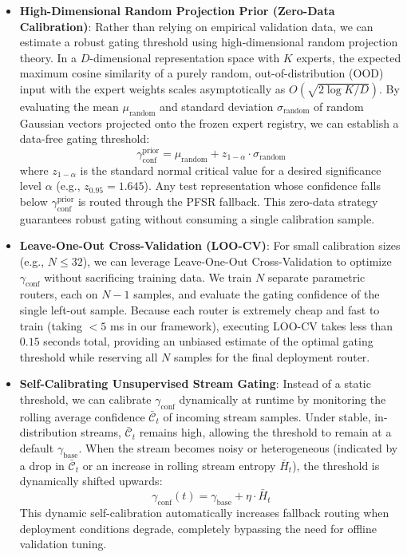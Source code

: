 \documentclass{article}
\theoremstyle{plain}
\theoremstyle{definition}
\theoremstyle{remark}
\begin{document}
\begin{itemize}
    \item \textbf{High-Dimensional Random Projection Prior (Zero-Data Calibration)}: Rather than relying on empirical validation data, we can estimate a robust gating threshold using high-dimensional random projection theory. In a $D$-dimensional representation space with $K$ experts, the expected maximum cosine similarity of a purely random, out-of-distribution (OOD) input with the expert weights scales asymptotically as $O(\sqrt{2\log K / D})$. By evaluating the mean $\mu_{\text{random}}$ and standard deviation $\sigma_{\text{random}}$ of random Gaussian vectors projected onto the frozen expert registry, we can establish a data-free gating threshold:
    \begin{equation}
    \gamma_{\text{conf}}^{\text{prior}} = \mu_{\text{random}} + z_{1-\alpha} \cdot \sigma_{\text{random}}
    \end{equation}
    where $z_{1-\alpha}$ is the standard normal critical value for a desired significance level $\alpha$ (e.g., $z_{0.95} = 1.645$). Any test representation whose confidence falls below $\gamma_{\text{conf}}^{\text{prior}}$ is routed through the PFSR fallback. This zero-data strategy guarantees robust gating without consuming a single calibration sample.
    \item \textbf{Leave-One-Out Cross-Validation (LOO-CV)}: For small calibration sizes (e.g., $N \le 32$), we can leverage Leave-One-Out Cross-Validation to optimize $\gamma_{\text{conf}}$ without sacrificing training data. We train $N$ separate parametric routers, each on $N-1$ samples, and evaluate the gating confidence of the single left-out sample. Because each router is extremely cheap and fast to train (taking $<5$ ms in our framework), executing LOO-CV takes less than $0.15$ seconds total, providing an unbiased estimate of the optimal gating threshold while reserving all $N$ samples for the final deployment router.
    \item \textbf{Self-Calibrating Unsupervised Stream Gating}: Instead of a static threshold, we can calibrate $\gamma_{\text{conf}}$ dynamically at runtime by monitoring the rolling average confidence $\bar{\mathcal{C}}_t$ of incoming stream samples. Under stable, in-distribution streams, $\bar{\mathcal{C}}_t$ remains high, allowing the threshold to remain at a default $\gamma_{\text{base}}$. When the stream becomes noisy or heterogeneous (indicated by a drop in $\bar{\mathcal{C}}_t$ or an increase in rolling stream entropy $\bar{H}_t$), the threshold is dynamically shifted upwards:
    \begin{equation}
    \gamma_{\text{conf}}(t) = \gamma_{\text{base}} + \eta \cdot \bar{H}_t
    \end{equation}
    This dynamic self-calibration automatically increases fallback routing when deployment conditions degrade, completely bypassing the need for offline validation tuning.
\end{itemize}
\end{document}
